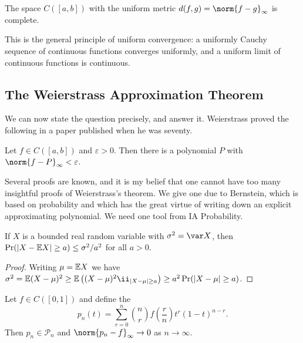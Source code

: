 \documentclass[a4paper]{scrartcl}
\newcommand{\Pn}{\mathcal{P}}
\begin{document}
\begin{theorem}\label{thm:cab-complete}
	The space $C([a,b])$ with the uniform metric $d(f,g) = \norm{f-g}_\infty$ is complete.
\end{theorem}

This is the general principle of uniform convergence: a uniformly Cauchy sequence of continuous functions converges uniformly, and a uniform limit of continuous functions is continuous.

\subsection{The Weierstrass Approximation Theorem}

We can now state the question precisely, and answer it. Weierstrass proved the following in a paper published when he was seventy.

\begin{theorem}\label{tia-thm:weierstrass}
	Let $f \in C([a,b])$ and $\varepsilon>0$. Then there is a polynomial $P$ with $\norm{f-P}_\infty<\varepsilon$.
\end{theorem}

Several proofs are known, and it is my belief that one cannot have too many insightful proofs of Weierstrass's theorem. We give one due to Bernstein, which is based on probability and which has the great virtue of writing down an explicit approximating polynomial. We need one tool from IA Probability.

\begin{theorem}\label{thm:chebyshev-ineq}
	If $X$ is a bounded real random variable with $\sigma^2 = \var X$, then $\Pr(|X-\mathbb{E} X|\geq a) \leq \sigma^2/a^2$ for all $a>0$.
\end{theorem}

\begin{proof}
	Writing $\mu = \mathbb{E} X$ we have $\sigma^2 = \EE(X-\mu)^2 \geq \EE\left((X-\mu)^2\ii_{|X-\mu|\geq a}\right) \geq a^2\Pr(|X-\mu|\geq a)$.
\end{proof}

\begin{theorem}[Bernstein]\label{thm:bernstein}
	Let $f\in C([0,1])$ and define the 
	$$p_n(t) = \sum_{r=0}^n\binom{n}{r}f\!\left(\frac{r}{n}\right)t^r(1-t)^{n-r}.$$
	Then $p_n \in \Pn_n$ and $\norm{p_n - f}_\infty\to 0$ as $n \to\infty$.
\end{theorem}
\end{document}
